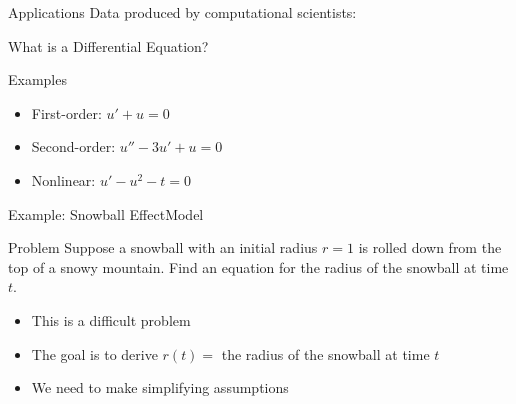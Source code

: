 \documentclass[10pt]{beamer}
\begin{document}

\begin{frame}{Applications}
Data produced by computational scientists:

\end{frame}


\begin{frame}{What is a Differential Equation?}

{}

\vspace{3mm}

\begin{block}{Examples}
\begin{itemize}
    \item First-order: \( u' + u = 0 \)
    \item Second-order: \( u'' - 3u' + u = 0 \)
    \item Nonlinear: \( u' - u^2 - t  = 0\)
\end{itemize}
\end{block}


\end{frame}
\begin{frame}{Example: Snowball Effect}{Model}

\begin{block}{Problem}
Suppose a snowball with an initial radius $r=1$ is rolled down from the top of a snowy mountain. Find an equation for the radius of the snowball at time $t$.  
\end{block}

\begin{itemize}
    \item This is a difficult problem
    \item The goal is to derive $r(t) = $ the radius of the snowball at time $t$
    \item We need to make simplifying assumptions
\end{itemize}

{
}
\end{frame}
\end{document}
